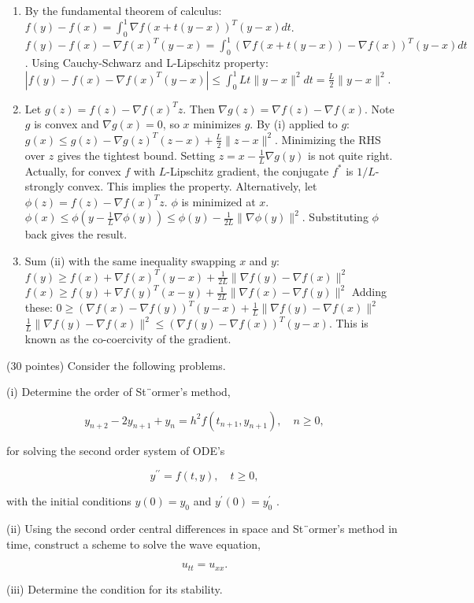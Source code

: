 \begin{solution}
\begin{enumerate}
    \item[(i)] By the fundamental theorem of calculus:
    $f(y) - f(x) = \int_0^1 \nabla f(x + t(y-x))^T (y-x) dt$.
    $f(y) - f(x) - \nabla f(x)^T(y-x) = \int_0^1 (\nabla f(x + t(y-x)) - \nabla f(x))^T (y-x) dt$.
    Using Cauchy-Schwarz and L-Lipschitz property:
    $|f(y) - f(x) - \nabla f(x)^T(y-x)| \leq \int_0^1 L t \|y-x\|^2 dt = \frac{L}{2} \|y-x\|^2$.

    \item[(ii)] Let $g(z) = f(z) - \nabla f(x)^T z$. Then $\nabla g(z) = \nabla f(z) - \nabla f(x)$. Note $g$ is convex and $\nabla g(x) = 0$, so $x$ minimizes $g$.
    By (i) applied to $g$: $g(x) \leq g(z) - \nabla g(z)^T(z-x) + \frac{L}{2}\|z-x\|^2$.
    Minimizing the RHS over $z$ gives the tightest bound. Setting $z = x - \frac{1}{L} \nabla g(y)$ is not quite right.
    Actually, for convex $f$ with $L$-Lipschitz gradient, the conjugate $f^*$ is $1/L$-strongly convex. This implies the property.
    Alternatively, let $\phi(z) = f(z) - \nabla f(x)^T z$. $\phi$ is minimized at $x$.
    $\phi(x) \leq \phi(y - \frac{1}{L} \nabla \phi(y)) \leq \phi(y) - \frac{1}{2L} \|\nabla \phi(y)\|^2$.
    Substituting $\phi$ back gives the result.

    \item[(iii)] Sum (ii) with the same inequality swapping $x$ and $y$:
    $f(y) \geq f(x) + \nabla f(x)^T(y-x) + \frac{1}{2L} \|\nabla f(y) - \nabla f(x)\|^2$
    $f(x) \geq f(y) + \nabla f(y)^T(x-y) + \frac{1}{2L} \|\nabla f(x) - \nabla f(y)\|^2$
    Adding these:
    $0 \geq (\nabla f(x) - \nabla f(y))^T(y-x) + \frac{1}{L} \|\nabla f(y) - \nabla f(x)\|^2$
    $\frac{1}{L} \|\nabla f(y) - \nabla f(x)\|^2 \leq (\nabla f(y) - \nabla f(x))^T(y-x)$.
    This is known as the co-coercivity of the gradient.
\end{enumerate}
\end{solution}

\begin{exercise}
\label{applied:2019:9}
(30 pointes) Consider the following problems.

(i) Determine the order of St¨ormer’s method,

\[
y _ {n + 2} - 2 y _ {n + 1} + y _ {n} = h ^ {2} f \left(t _ {n + 1}, y _ {n + 1}\right), \quad n \geqslant 0,
\]

for solving the second order system of ODE’s

\[
y ^ {\prime \prime} = f (t, y), \quad t \geqslant 0,
\]

with the initial conditions $y ( 0 ) = y _ { 0 }$ and $y ^ { \prime } ( 0 ) = y _ { 0 } ^ { \prime }$ .

(ii) Using the second order central differences in space and St¨ormer’s method in time, construct a scheme to solve the wave equation,

\[
u _ {t t} = u _ {x x}.
\]

(iii) Determine the condition for its stability.
\end{exercise}

